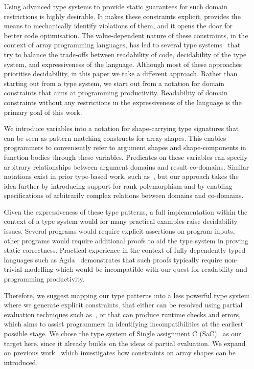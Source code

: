 \documentclass[sigconf,screen]{acmart}
\begin{document}
Using advanced type systems to provide static guarantees for such domain restrictions is highly desirable.
It makes these constraints explicit, provides the means to mechanically identify violations of them, and it opens the door for better code optimisation.
The value-dependent nature of these constraints, in the context of array programming languages, has led to several type systems~\cite{indexed,cube,dependent-types,futhark-size-parameters,remora} that try to balance the trade-offs between readability of code, decidability of the type system, and expressiveness of the language.
Although most of these approaches prioritise decidability, in this paper we take a different approach.
Rather than starting out from a type system, we start out from a notation for domain constraints that aims at programming productivity.
Readability of domain constraints without any restrictions in the expressiveness of the language is the primary goal of this work.

We introduce variables into a notation for shape-carrying type signatures that can be seen as pattern matching constructs for array shapes.
This enables programmers to conveniently refer to argument shapes and shape-components in function bodies through these variables.
Predicates on these variables can specify arbitrary relationships between argument domains and result co-domains.
Similar notations exist in prior type-based work, such as~\cite{dependent-types,futhark-size-parameters}, but our approach takes the idea further by introducing support for rank-polymorphism and by enabling specifications of arbitrarily complex relations between domains and co-domains.

Given the expressiveness of these type patterns, a full implementation within the context of a type system would for many practical examples raise decidability issues.
Several programs would require explicit assertions on program inputs, other programs would require additional proofs to aid the type system in proving static correctness.
Practical experience in the context of fully dependently typed languages such as Agda~\cite{agda} demonstrates that such proofs typically require non-trivial modelling which would be incompatible with our quest for readability and programming productivity.

Therefore, we suggest mapping our type patterns into a less powerful type system where we generate explicit constraints, that either can be resolved using partial evaluation techniques such as~\cite{sac-symbiotic,sac-contracts}, or that can produce runtime checks and errors, which aims to assist programmers in identifying incompatibilities at the earliest possible stage.
We chose the type system of Single assignment C (SaC)~\cite{sac,sac-productivity} as our target here, since it already builds on the ideas of partial evaluation.
We expand on previous work~\cite{sac-user-constraints,sac-hybrid-types} which investigates how constraints on array shapes can be introduced.
\end{document}
